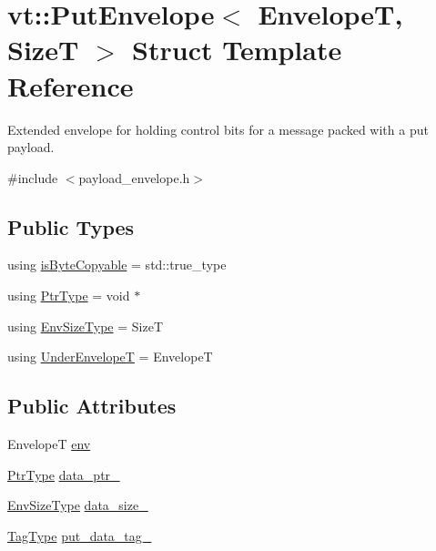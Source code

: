\hypertarget{structvt_1_1_put_envelope}{}\section{vt\+:\+:Put\+Envelope$<$ EnvelopeT, SizeT $>$ Struct Template Reference}
\label{structvt_1_1_put_envelope}


Extended envelope for holding control bits for a message packed with a put payload.  




{\ttfamily \#include $<$payload\+\_\+envelope.\+h$>$}

\subsection*{Public Types}
\begin{DoxyCompactItemize}
\item 
using \hyperlink{structvt_1_1_put_envelope_a64bb0e1e7e7db39c62edbc9ee312fc24}{is\+Byte\+Copyable} = std\+::true\+\_\+type
\item 
using \hyperlink{structvt_1_1_put_envelope_a9486c3caa1ba9be60e4ef6fdd1a11930}{Ptr\+Type} = void $\ast$
\item 
using \hyperlink{structvt_1_1_put_envelope_ad086e484eb23ab04b0a055aff2cb7b19}{Env\+Size\+Type} = SizeT
\item 
using \hyperlink{structvt_1_1_put_envelope_a8e9e6c105983442674c194da5712df28}{Under\+EnvelopeT} = EnvelopeT
\end{DoxyCompactItemize}
\subsection*{Public Attributes}
\begin{DoxyCompactItemize}
\item 
EnvelopeT \hyperlink{structvt_1_1_put_envelope_a046a6ec334cde93251c21eded8d3fbc4}{env}
\item 
\hyperlink{structvt_1_1_put_envelope_a9486c3caa1ba9be60e4ef6fdd1a11930}{Ptr\+Type} \hyperlink{structvt_1_1_put_envelope_a6cba549a8e4a1fd5ff577979bad80300}{data\+\_\+ptr\+\_\+}
\item 
\hyperlink{structvt_1_1_put_envelope_ad086e484eb23ab04b0a055aff2cb7b19}{Env\+Size\+Type} \hyperlink{structvt_1_1_put_envelope_a1f30fc6ecbceff781ad132605c453b56}{data\+\_\+size\+\_\+}
\item 
\hyperlink{namespacevt_a84ab281dae04a52a4b243d6bf62d0e52}{Tag\+Type} \hyperlink{structvt_1_1_put_envelope_ac4a0614fbf3e30fcdeb13a376ccacffe}{put\+\_\+data\+\_\+tag\+\_\+}
\end{DoxyCompactItemize}


